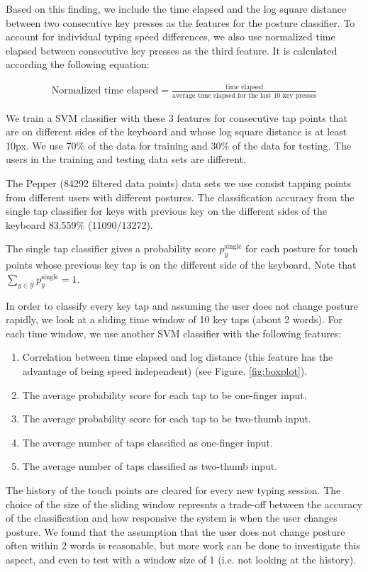 \documentclass{sigchi}
\begin{document}
Based on this finding, we include the time elapsed and the log square distance
between two consecutive key presses as the features for the posture classifier. 
To account for individual typing speed differences, we also use normalized time 
elapsed between consecutive key presses as the third feature. It is calculated according the following equation:

\begin{align}
\text{Normalized time elapsed} = \frac{\text{time elapsed}}{\text{average time
elapsed for the last 10 key presses}}
\end{align}

We train a SVM classifier with these 3 features for consecutive tap points that 
are on different sides of the keyboard and whose log square distance is at least
10px. We use 70\% of the data for training and 30\% of the
data for testing. The users in the training and testing data sets are different.

The Pepper (84292 filtered data points) data sets we use consist tapping points 
from different users with different postures. The classification accuracy from
the single tap classifier for keys with previous key on the different sides of
the keyboard 83.559\% (11090/13272).

The single tap classifier gives a probability score $p_y^{\text{single}}$ for each posture for touch
points whose previous key tap is on the different side of the keyboard. Note that
$\displaystyle\sum_{y \in \mathcal{Y}}p_y^{\text{single}} = 1$.
 
In order to classify every key tap and assuming the user does not change posture 
rapidly, we look at a sliding time window of 10 key taps (about 2 words). For 
each time window, we use another SVM classifier with the following features:
\begin{enumerate}
\item Correlation between time elapsed and log distance (this feature has the
advantage of being speed independent) (see Figure. \ref{fig:boxplot}).
\item The average probability score for each tap to be one-finger input.
\item The average probability score for each tap to be two-thumb input.
\item The average number of taps classified as one-finger input.
\item The average number of taps classified as two-thumb input.
\end{enumerate}
The history of the touch points are cleared for every new typing session.
The choice of the size of the sliding window represnts a trade-off between the 
accuracy of the classification and how responsive the system is when the user
changes posture. We found that the assumption that the user does not change posture
often within 2 words is reasonable, but more work can be done to investigate this
aspect, and even to test with a window size of 1 (i.e. not 
looking at the history).
\end{document}
